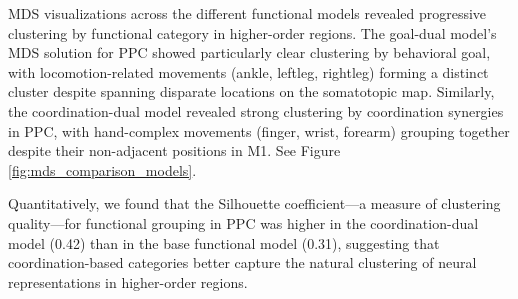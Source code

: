 \documentclass{article}
\begin{document}
MDS visualizations across the different functional models revealed progressive clustering by functional category in higher-order regions. The goal-dual model's MDS solution for PPC showed particularly clear clustering by behavioral goal, with locomotion-related movements (ankle, leftleg, rightleg) forming a distinct cluster despite spanning disparate locations on the somatotopic map. Similarly, the coordination-dual model revealed strong clustering by coordination synergies in PPC, with hand-complex movements (finger, wrist, forearm) grouping together despite their non-adjacent positions in M1. See Figure \ref{fig:mds_comparison_models}.

Quantitatively, we found that the Silhouette coefficient—a measure of clustering quality—for functional grouping in PPC was higher in the coordination-dual model (0.42) than in the base functional model (0.31), suggesting that coordination-based categories better capture the natural clustering of neural representations in higher-order regions.
\end{document}
